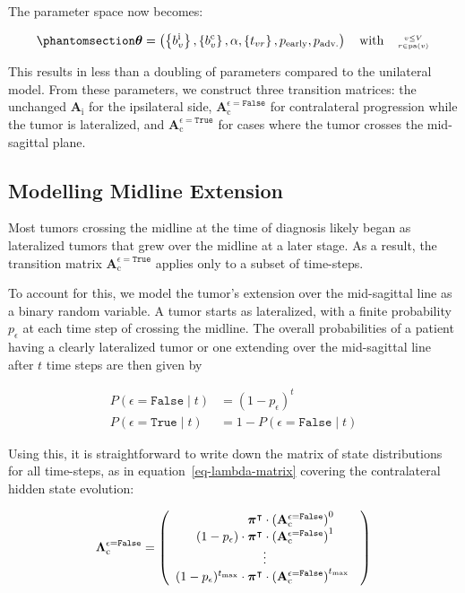\documentclass[
  sn-mathphys-num,
]{sn-jnl}
\begin{document}
The parameter space now becomes:

\begin{equation}\phantomsection\label{eq-bi-param-space}{
\boldsymbol{\theta} = \left( \left\{ b_v^\text{i} \right\}, \left\{ b_v^\text{c} \right\}, \alpha, \left\{ t_{vr} \right\}, p_\text{early}, p_\text{adv.} \right) \quad \text{with} \quad \genfrac{}{}{0pt}{2}{v\leq V}{r\in\operatorname{pa}(v)}
}\end{equation}

This results in less than a doubling of parameters compared to the
unilateral model. From these parameters, we construct three transition
matrices: the unchanged \(\mathbf{A}_\text{i}\) for the ipsilateral
side, \(\mathbf{A}_\text{c}^{\epsilon=\texttt{False}}\) for
contralateral progression while the tumor is lateralized, and
\(\mathbf{A}_\text{c}^{\epsilon=\texttt{True}}\) for cases where the
tumor crosses the mid-sagittal plane.

\subsection{Modelling Midline Extension}\label{sec-midline}

Most tumors crossing the midline at the time of diagnosis likely began
as lateralized tumors that grew over the midline at a later stage. As a
result, the transition matrix
\(\mathbf{A}_\text{c}^{\epsilon=\texttt{True}}\) applies only to a
subset of time-steps.

To account for this, we model the tumor's extension over the
mid-sagittal line as a binary random variable. A tumor starts as
lateralized, with a finite probability \(p_\epsilon\) at each time step
of crossing the midline. The overall probabilities of a patient having a
clearly lateralized tumor or one extending over the mid-sagittal line
after \(t\) time steps are then given by

\[
\begin{aligned}
P(\epsilon = \texttt{False} \mid t) &= (1 - p_\epsilon)^t \\
P(\epsilon = \texttt{True} \mid t) &= 1 - P(\epsilon = \texttt{False} \mid t)
\end{aligned}
\]

Using this, it is straightforward to write down the matrix of state
distributions for all time-steps, as in equation~\ref{eq-lambda-matrix}
covering the contralateral hidden state evolution:

\[
\boldsymbol{\Lambda}_\text{c}^{\epsilon=\texttt{False}} =
\left(
\begin{array}{r}
\boldsymbol{\pi}^\intercal \cdot \left( \mathbf{A}_\text{c}^{\epsilon=\texttt{False}} \right)^{0\phantom{t_\text{max}}} \\
(1-p_\epsilon) \cdot \boldsymbol{\pi}^\intercal \cdot \left( \mathbf{A}_\text{c}^{\epsilon=\texttt{False}} \right)^{1\phantom{t_\text{max}}} \\
\hfill \vdots \hfill \\
(1-p_\epsilon)^{t_\text{max}} \cdot \boldsymbol{\pi}^\intercal \cdot \left( \mathbf{A}_\text{c}^{\epsilon=\texttt{False}} \right)^{t_\text{max}\phantom{0}} \\
\end{array}
\right)
\]
\end{document}
